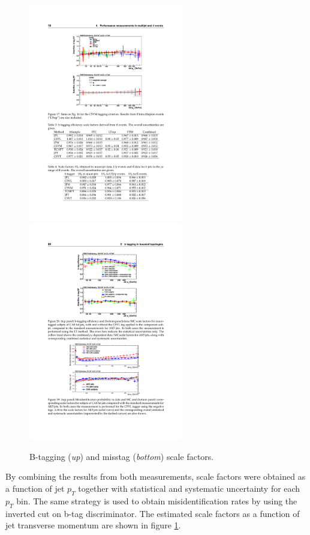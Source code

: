 \begin{figure}
\centering
\includegraphics[width=0.6\textwidth]{Figures/b-tagSF.pdf}
\includegraphics[width=0.6\textwidth]{Figures/miss-tag.pdf}
\caption{B-tagging (\textit{up}) and misstag (\textit{bottom}) scale factors. \cite{CMS:2013vea}}
\label{fig:nesto}
\end{figure}
By combining the results from both measurements, scale factors were obtained as a function of jet $p_T$ together with statistical and systematic uncertainty for each $p_T$ bin. The same strategy is used to obtain misidentification rates by using the inverted cut on b-tag discriminator. The estimated scale factors as a function of jet transverse momentum are shown in figure \ref{fig:nesto}.  
